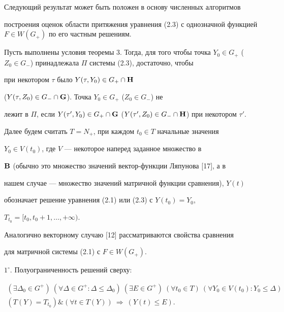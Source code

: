 Следующий результат может быть положен в основу численных алгоритмов


построения оценок области притяжения уравнения (2.3) с однозначной функцией $F\in


W(G_+)$ по его частным решениям.





\begin{cor}


Пусть выполнены условия теоремы 3. Тогда, для того чтобы точка $Y_0\in


G_+$ ($Z_0\in G_-$) принадлежала $\Pi$ системы (2.3), достаточно, чтобы


при некотором $\tau$ было $Y(\tau,Y_0)\in G_+\cap\bold H$


($Y(\tau,Z_0)\in G_-\cap\bold G$). Точка $Y_0\in G_+$ ($Z_0\in G_-$) не


лежит в $\Pi$, если $Y(\tau',Y_0)\in G_+\cap\bold G$ ($Y(\tau',Z_0)\in


G_-\cap\bold H$) при некотором $\tau'$.


\end{cor}





Далее будем считать $T=N_+$, при каждом $t_0\in T$ начальные значения


$Y_0\in V(t_0)$, где $V$ --- некоторое наперед заданное множество в


$\bold B$ (обычно это множество значений вектор-функции Ляпунова [17], а в


нашем случае --- множество значений матричной функции сравнения), $Y(t)$


обозначает решение уравнения (2.1) или (2.3) с $Y(t_0)=Y_0$,


$T_{t_0}=[t_0,t_0+1,\dotsc,+\infty)$.





Аналогично векторному случаю [12] рассматриваются свойства сравнения


для матричной системы (2.1) с $F\in W(G_+)$.





$1^\circ$. Полуограниченность решений сверху:


\begin{gather*}


(\exists\Delta_0\in G^+)\ (\forall \Delta\in G^+:\Delta\le\Delta_0)


\ (\exists E\in G^+)\ (\forall t_0\in T)\ (\forall Y_0\in V(t_0):


Y_0\le\Delta) \\


(T(Y)=T_{t_0})\&(\forall t\in T(Y))\ \Rightarrow \ (Y(t)\le E).


\end{gather*}





